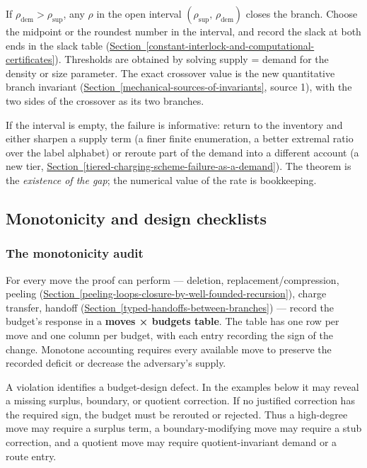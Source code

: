 \documentclass[
  11pt,
]{article}
\theoremstyle{definition}
\newcommand{\secref}[1]{\hyperref[#1]{Section~\ref*{#1}}}
\begin{document}
If \(\rho_{\mathrm{dem}} > \rho_{\mathrm{sup}}\), any \(\rho\) in the
open interval \((\rho_{\mathrm{sup}},\,\rho_{\mathrm{dem}})\) closes the
branch. Choose the midpoint or the roundest number in the interval, and
record the slack at both ends in the slack table (\secref{constant-interlock-and-computational-certificates}).
Thresholds are obtained by solving supply = demand for the density or
size parameter. The exact crossover value is the new quantitative branch
invariant (\secref{mechanical-sources-of-invariants}, source 1), with the two sides of the crossover
as its two branches.

If the interval is empty, the failure is informative: return to the
inventory and either sharpen a supply term (a finer finite enumeration,
a better extremal ratio over the label alphabet) or reroute part of the
demand into a different account (a new tier, \secref{tiered-charging-scheme-failure-as-a-demand}). The theorem
is the \emph{existence of the gap}; the numerical value of the rate is
bookkeeping.

\subsection{Monotonicity and design checklists}

\subsubsection{The monotonicity
audit}\label{the-monotonicity-audit}

For every move the proof can perform --- deletion,
replacement/compression, peeling (\secref{peeling-loops-closure-by-well-founded-recursion}), charge transfer,
handoff (\secref{typed-handoffs-between-branches}) --- record the budget's response in a
\textbf{moves × budgets table}. The table has one row per move and one
column per budget, with each entry recording the sign of the change.
Monotone accounting requires every available move to preserve the
recorded deficit or decrease the adversary's supply.

A violation identifies a budget-design defect. In the examples below it
may reveal a missing surplus, boundary, or quotient correction. If no
justified correction has the required sign, the budget must be rerouted
or rejected. Thus a high-degree move may require a surplus term, a
boundary-modifying move may require a stub correction, and a quotient
move may require quotient-invariant demand or a route entry.
\end{document}
